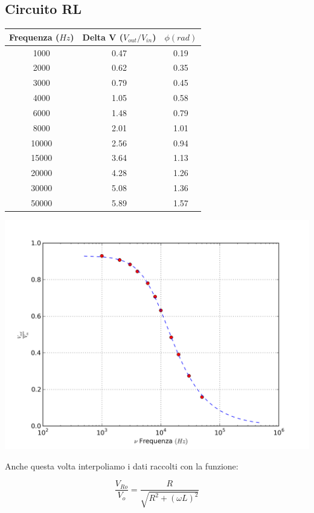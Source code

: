\subsection{Circuito RL}


\begin{center}
\begin{tabular}{*{3}{c}}
Frequenza ($Hz$) & Delta V ($V_{out}/V_{in}$) & $\phi (rad)$ \\
\midrule
1000& 0.47 & 0.19 \\
2000 & 0.62 & 0.35\\
3000 & 0.79 & 0.45\\
4000 & 1.05 & 0.58\\
6000 & 1.48 & 0.79\\
8000 & 2.01 & 1.01\\
10000 & 2.56 & 0.94\\
15000 & 3.64 & 1.13\\
20000 & 4.28 & 1.26\\
30000 & 5.08 & 1.36\\
50000 & 5.89 & 1.57\\
\end{tabular}
\end{center}


\begin{center}
 \includegraphics[scale=0.70]{grafici/C3/ddpindu.png}
\end{center}

Anche questa volta interpoliamo i dati raccolti con la funzione:

$$\frac{V_{Ro}}{V_o} = \frac{R}{\sqrt{R^2+(\omega L)^2}}$$

